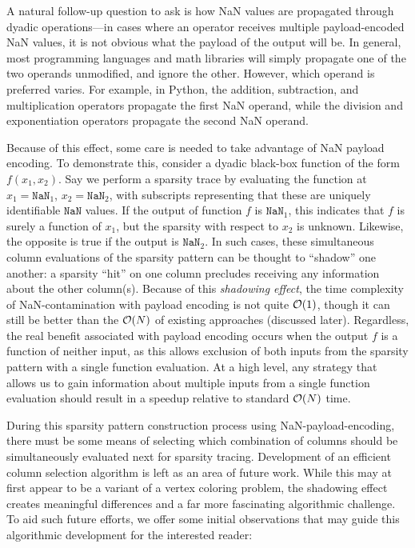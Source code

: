 A natural follow-up question to ask is how NaN values are propagated through dyadic operations—in cases where an operator receives multiple payload-encoded NaN values, it is not obvious what the payload of the output will be. In general, most programming languages and math libraries will simply propagate one of the two operands unmodified, and ignore the other. However, which operand is preferred varies. For example, in Python, the addition, subtraction, and multiplication operators propagate the first NaN operand, while the division and exponentiation operators propagate the second NaN operand.

Because of this effect, some care is needed to take advantage of NaN payload encoding. To demonstrate this, consider a dyadic black-box function of the form $f(x_1, x_2)$. Say we perform a sparsity trace by evaluating the function at $x_1=\texttt{NaN}_1$, $x_2=\texttt{NaN}_2$, with subscripts representing that these are uniquely identifiable $\texttt{NaN}$ values. If the output of function $f$ is $\texttt{NaN}_1$, this indicates that $f$ is surely a function of $x_1$, but the sparsity with respect to $x_2$ is unknown. Likewise, the opposite is true if the output is $\texttt{NaN}_2$. In such cases, these simultaneous column evaluations of the sparsity pattern can be thought to ``shadow'' one another: a sparsity ``hit'' on one column precludes receiving any information about the other column(s). Because of this \emph{shadowing effect}, the time complexity of NaN-contamination with payload encoding is not quite $\mathcal{O}(1)$, though it can still be better than the $\mathcal{O}(N)$ of existing approaches (discussed later). Regardless, the real benefit associated with payload encoding occurs when the output $f$ is a function of neither input, as this allows exclusion of both inputs from the sparsity pattern with a single function evaluation. At a high level, any strategy that allows us to gain information about multiple inputs from a single function evaluation should result in a speedup relative to standard $\mathcal{O}(N)$ time.

During this sparsity pattern construction process using NaN-payload-encoding, there must be some means of selecting which combination of columns should be simultaneously evaluated next for sparsity tracing. Development of an efficient column selection algorithm is left as an area of future work. While this may at first appear to be a variant of a vertex coloring problem, the shadowing effect creates meaningful differences and a far more fascinating algorithmic challenge. To aid such future efforts, we offer some initial observations that may guide this algorithmic development for the interested reader:

